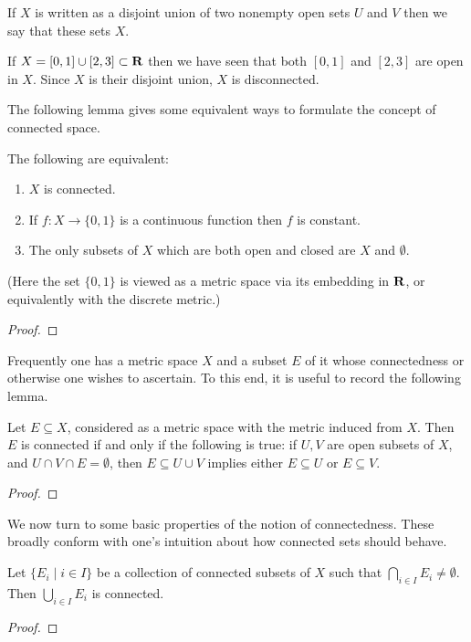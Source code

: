 If $X$ is written as a disjoint union of two nonempty open sets $U$ and $V$ then we say that these sets  $X$.

\begin{example}
If $X=[0,1]\cup[2,3]\subset\mathbf R$ then we have seen that both $[0,1]$ and $[2,3]$ are open in $X$. Since $X$ is their disjoint union, $X$ is disconnected.
\end{example}

The following lemma gives some equivalent ways to formulate the concept of connected space.

\begin{lemma}
The following are equivalent:
\begin{enumerate}[label=(\roman*)]
\item $X$ is connected.
\item If $f:X\to\{0,1\}$ is a continuous function then $f$ is constant.
\item The only subsets of $X$ which are both open and closed are $X$ and $\emptyset$.
\end{enumerate}
(Here the set $\{0,1\}$ is viewed as a metric space via its embedding in $\mathbf R$, or equivalently with the discrete metric.)
\end{lemma}

\begin{proof}

\end{proof}

Frequently one has a metric space $X$ and a subset $E$ of it whose connectedness or otherwise one wishes to ascertain. To this end, it is useful to record the following lemma.

\begin{lemma}
Let $E\subseteq X$, considered as a metric space with the metric induced from $X$. Then $E$ is connected if and only if the following is true: if $U,V$ are open subsets of $X$, and $U\cap V\cap E=\emptyset$, then $E\subseteq U\cup V$ implies either $E\subseteq U$ or $E\subseteq V$.
\end{lemma}

\begin{proof}

\end{proof}

We now turn to some basic properties of the notion of connectedness. These broadly conform with one's intuition about how connected sets should behave.

\begin{lemma}
Let $\{E_i\mid i\in I\}$ be a collection of connected subsets of $X$ such that $\bigcap_{i\in I}E_i\neq\emptyset$. Then $\bigcup_{i\in I}E_i$ is connected.
\end{lemma}

\begin{proof}

\end{proof}

